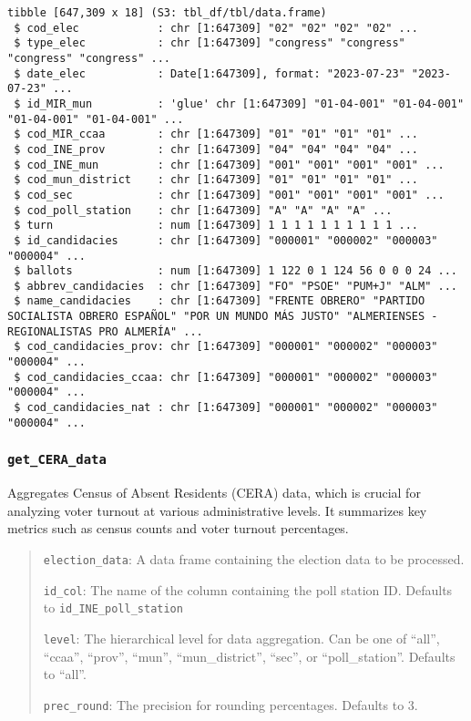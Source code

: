\documentclass[
  letterpaper,
  DIV=11,
  numbers=noendperiod]{scrreprt}
\begin{document}
\begin{verbatim}
tibble [647,309 x 18] (S3: tbl_df/tbl/data.frame)
 $ cod_elec            : chr [1:647309] "02" "02" "02" "02" ...
 $ type_elec           : chr [1:647309] "congress" "congress" "congress" "congress" ...
 $ date_elec           : Date[1:647309], format: "2023-07-23" "2023-07-23" ...
 $ id_MIR_mun          : 'glue' chr [1:647309] "01-04-001" "01-04-001" "01-04-001" "01-04-001" ...
 $ cod_MIR_ccaa        : chr [1:647309] "01" "01" "01" "01" ...
 $ cod_INE_prov        : chr [1:647309] "04" "04" "04" "04" ...
 $ cod_INE_mun         : chr [1:647309] "001" "001" "001" "001" ...
 $ cod_mun_district    : chr [1:647309] "01" "01" "01" "01" ...
 $ cod_sec             : chr [1:647309] "001" "001" "001" "001" ...
 $ cod_poll_station    : chr [1:647309] "A" "A" "A" "A" ...
 $ turn                : num [1:647309] 1 1 1 1 1 1 1 1 1 1 ...
 $ id_candidacies      : chr [1:647309] "000001" "000002" "000003" "000004" ...
 $ ballots             : num [1:647309] 1 122 0 1 124 56 0 0 0 24 ...
 $ abbrev_candidacies  : chr [1:647309] "FO" "PSOE" "PUM+J" "ALM" ...
 $ name_candidacies    : chr [1:647309] "FRENTE OBRERO" "PARTIDO SOCIALISTA OBRERO ESPAÑOL" "POR UN MUNDO MÁS JUSTO" "ALMERIENSES - REGIONALISTAS PRO ALMERÍA" ...
 $ cod_candidacies_prov: chr [1:647309] "000001" "000002" "000003" "000004" ...
 $ cod_candidacies_ccaa: chr [1:647309] "000001" "000002" "000003" "000004" ...
 $ cod_candidacies_nat : chr [1:647309] "000001" "000002" "000003" "000004" ...
\end{verbatim}

\hypertarget{get_cera_data}{%
\subsubsection{\texorpdfstring{\texttt{get\_CERA\_data}}{get\_CERA\_data}}\label{get_cera_data}}

Aggregates Census of Absent Residents (CERA) data, which is crucial for
analyzing voter turnout at various administrative levels. It summarizes
key metrics such as census counts and voter turnout percentages.

\begin{quote}
\texttt{election\_data}: A data frame containing the election data to be
processed.

\texttt{id\_col}: The name of the column containing the poll station ID.
Defaults to \texttt{id\_INE\_poll\_station}

\texttt{level}: The hierarchical level for data aggregation. Can be one
of ``all'', ``ccaa'', ``prov'', ``mun'', ``mun\_district'', ``sec'', or
``poll\_station''. Defaults to ``all''.

\texttt{prec\_round}: The precision for rounding percentages. Defaults
to 3.
\end{quote}
\end{document}
